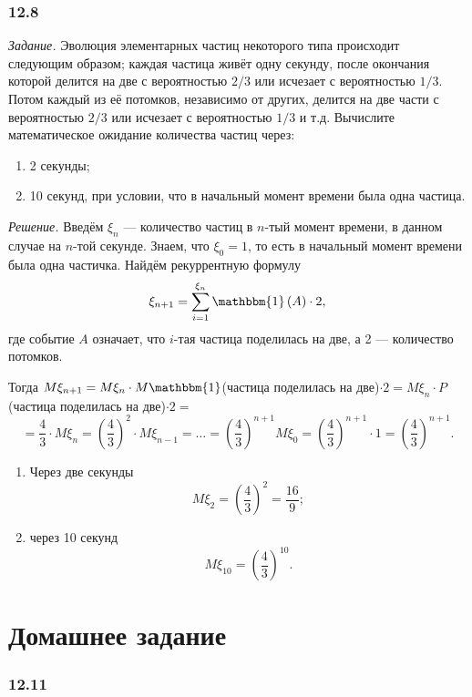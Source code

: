 \subsubsection*{12.8}

\textit{Задание.}
Эволюция элементарных частиц некоторого типа происходит следующим образом;
каждая частица живёт одну секунду, после окончания которой делится на две с вероятностью $2/3$ или исчезает с вероятностью $1/3$.
Потом каждый из её потомков, независимо от других, делится на две части с вероятностью $2/3$ или исчезает с вероятностью $1/3$ и т.д.
Вычислите математическое ожидание количества частиц через:
\begin{enumerate}[label=\alph*)]
\item 2 секунды;
\item 10 секунд, при условии, что в начальный момент времени была одна частица.
\end{enumerate}

\textit{Решение.} Введём $ \xi_n$ --- количество частиц в $n$-тый момент времени, в данном случае на $n$-той секунде.
Знаем, что $ \xi_0 = 1$, то есть в начальный момент времени была одна частичка.
Найдём рекуррентную формулу
$$ \xi_{n+1} = \sum \limits_{i=1}^{ \xi_n} \mathbbm{1} \left( A \right) \cdot 2,$$
где событие $A$ означает, что $i$-тая частица поделилась на две, а 2 --- количество потомков.

Тогда $M \xi_{n+1} = M \xi_n \cdot M \mathbbm{1}$(частица поделилась на две)$ \cdot 2 = M \xi_n \cdot P$(частица поделилась на две)$ \cdot 2 =$
$$= \frac{4}{3} \cdot M \xi_n =
\left( \frac{4}{3} \right)^2 \cdot M \xi_{n-1} =
\dotsc =
\left( \frac{4}{3} \right)^{n+1} M \xi_0 =
\left( \frac{4}{3} \right)^{n+1} \cdot 1 =
\left( \frac{4}{3} \right)^{n+1}.$$

\begin{enumerate}[label=\alph*)]
\item Через две секунды
$$M \xi_2 =
\left( \frac{4}{3} \right)^2 =
\frac{16}{9};$$
\item через 10 секунд
$$M \xi_{10} =
\left( \frac{4}{3} \right)^{10}.$$
\end{enumerate}

\section*{Домашнее задание}

\subsubsection*{12.11}

